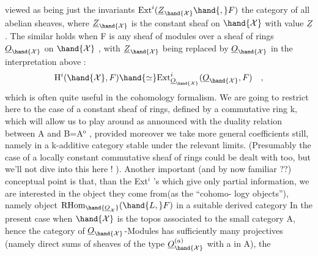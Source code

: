 
viewed as being just the invariants $\mathrm{Ext}^{i}(\underline{Z}_{\hand{\mathcal{X}}}\hand{,}F)$  the category of all
abelian sheaves, where $\underline{Z}_{\hand{\mathcal{X}}}$ is the constant sheaf on $\hand{\mathcal{X}}$ with value $\underline{Z}$ .
The similar   holds when F is any sheaf of modules over a sheaf
of rings $\underline{O}_{\hand{\mathcal{X}}}$ on $\hand{\mathcal{X}}$ , with $\underline{Z}_{\hand{\mathcal{X}}}$ being replaced by $\underline{O}_{\hand{\mathcal{X}}}$ in the interpretation
above :
\[ \mathrm{H}^{i}(\hand{\mathcal{X}}, F) \hand{\simeq} \mathrm{Ext}^{i}_{\underline{O}_{\hand{\mathcal{X}}}}(\underline{O}_{\hand{\mathcal{X}}}, F) \quad , \]
which is often quite useful in the cohomology formalism. We are going
to restrict here to the case of a constant sheaf of rings, defined by a
 commutative ring k, which will allow us to play around as announced
with the duality relation between A and B=A$^{\mathrm{o}}$ , provided moreover we
take more general coefficients still, namely   in a 
k-additive category  stable under the relevant limits. (Presumably the
case of a locally constant commutative sheaf of rings could be dealt
with too, but we'll not dive into this here ! ). Another important
(and by now familiar ??) conceptual point is that,     than 
the Ext$^{i}$ 's which give only partial information, we are interested in
the object  they come from(as the ``cohomo-%
logy objects''), namely  object $\mathrm{RHom}_{\hand{\underline{O}_{\mathcal{X}}}}(\hand{L,}F)$ in a suitable derived category
In the present case when $\hand{\mathcal{X}}$ is the topos associated to the small category
A, hence the category of $\underline{O}_{\hand{\mathcal{X}}}$-Modules has sufficiently many projectives
(namely direct sums of sheaves of the type $\underline{O}_{\hand{\mathcal{X}}}^{(a)}$ with a in A), the
